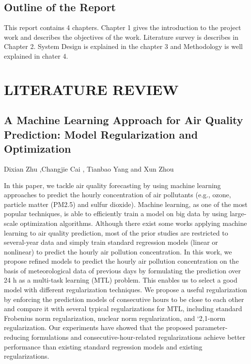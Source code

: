 \section{Outline of the Report}
This report contains 4 chapters. Chapter 1 gives the introduction to the project work and
describes the objectives of the work. Literature survey is describes in Chapter 2. System
Design is explained in the chapter 3 and Methodology  is well explained
in chater 4. 


\chapter{LITERATURE REVIEW}

\section{A Machine Learning Approach for Air Quality Prediction: Model Regularization and Optimization}

Dixian Zhu ,Changjie Cai , Tianbao Yang and Xun Zhou 

In this paper, we tackle air quality forecasting by using machine learning approaches
to predict the hourly concentration of air pollutants (e.g., ozone, particle matter (PM2.5) and sulfur
dioxide). Machine learning, as one of the most popular techniques, is able to efficiently train a model
on big data by using large-scale optimization algorithms. Although there exist some works applying
machine learning to air quality prediction, most of the prior studies are restricted to several-year
data and simply train standard regression models (linear or nonlinear) to predict the hourly air
pollution concentration. In this work, we propose refined models to predict the hourly air pollution
concentration on the basis of meteorological data of previous days by formulating the prediction over
24 h as a multi-task learning (MTL) problem. This enables us to select a good model with different
regularization techniques. We propose a useful regularization by enforcing the prediction models of
consecutive hours to be close to each other and compare it with several typical regularizations for
MTL, including standard Frobenius norm regularization, nuclear norm regularization, and `2,1-norm
regularization. Our experiments have showed that the proposed parameter-reducing formulations
and consecutive-hour-related regularizations achieve better performance than existing standard
regression models and existing regularizations.

